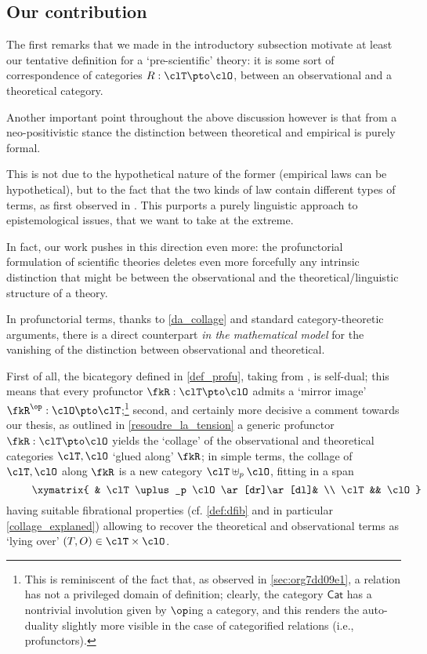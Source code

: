 \color{black}
\subsection{Our contribution}
The first remarks that we made in the introductory subsection motivate at least our tentative definition for a `pre-scientific' theory: it is some sort of correspondence of categories $R : \clT \pto \clO$, between an observational and a theoretical category.

Another important point throughout the above discussion however is that from a neo-positivistic stance the distinction between theoretical and empirical is purely formal.

This is not due to the hypothetical nature of the former (empirical laws can be hypothetical), but to the fact that the two kinds of law contain different types of terms, as first observed in \cite{carnap56}. This purports a purely linguistic approach to epistemological issues, that we want to take at the extreme.

In fact, our work pushes in this direction even more: the profunctorial formulation of scientific theories deletes even more forcefully any intrinsic distinction that might be between the observational and the theoretical\fshyp{}linguistic structure of a theory.

In profunctorial terms, thanks to \autoref{da_collage} and standard category\hyp{}theoretic arguments, there is a direct counterpart \emph{in the mathematical model} for the vanishing of the distinction between observational and theoretical.

First of all, the bicategory defined in \autoref{def_profu}, taking from \cite{benabou2000distributors}, is self-dual; this means that every profunctor $\fkR : \clT \pto \clO$ admits a `mirror image' $\fkR^\op : \clO \pto \clT$;\footnote{This is reminiscent of the fact that, as observed in \autoref{sec:org7dd09e1}, a relation has not a privileged domain of definition; clearly, the category $\mathsf{Cat}$ has a nontrivial involution given by $\op$ing a category, and this renders the auto-duality slightly more visible in the case of categorified relations (i.e., profunctors).} second, and certainly more decisive a comment towards our thesis, as outlined in \autoref{resoudre_la_tension} a generic profunctor $\fkR : \clT \pto\clO$ yields the `collage' of the observational and theoretical categories $\clT,\clO$ `glued along' $\fkR$; in simple terms, the collage of $\clT,\clO$ along $\fkR$ is a new category $\clT\uplus_p\clO$, fitting in a span
\[ \vcenter{\xymatrix{
			& \clT\uplus_p \clO \ar[dr]\ar[dl]& \\
			\clT  && \clO
		}} \] having suitable fibrational properties (cf. \autoref{def:dfib} and in particular \autoref{collage_explaned}) allowing to recover the theoretical and observational terms as `lying over' $(T,O)\in\clT\times\clO$.

